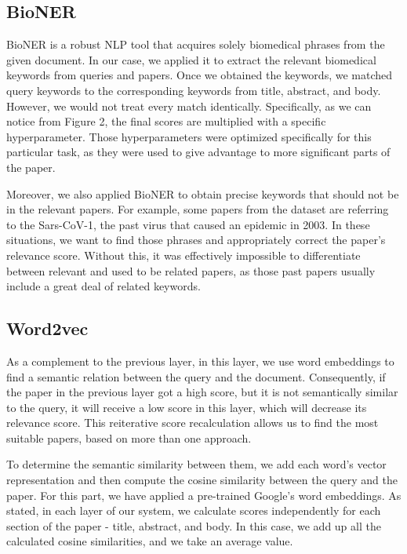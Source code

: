 \documentclass[10pt, a4paper]{article}
\begin{document}
	\subsection{BioNER}
	
	BioNER is a robust NLP tool that acquires solely biomedical phrases from the given document.  In our case, we applied it to extract the relevant biomedical keywords from queries and papers.  Once we obtained the keywords, we matched query keywords to the corresponding keywords from title, abstract, and body. However, we would not treat every match identically. Specifically, as we can notice from Figure 2, the final scores are multiplied with a specific hyperparameter.  Those hyperparameters were optimized specifically for this particular task, as they were used to give advantage to more significant parts of the paper.
	
	Moreover, we also applied BioNER to obtain precise keywords that should not be in the relevant papers. For example, some papers from the dataset are referring to the Sars-CoV-1, the past virus that caused an epidemic in 2003. In these situations, we want to find those phrases and appropriately correct the paper's relevance score. Without this, it was effectively impossible to differentiate between relevant and used to be related papers, as those past papers usually include a great deal of related keywords.
	
	\subsection{Word2vec}
	
	As a complement to the previous layer, in this layer, we use word embeddings to find a semantic relation between the query and the document. Consequently, if the paper in the previous layer got a high score, but it is not semantically similar to the query, it will receive a low score in this layer, which will decrease its relevance score. This reiterative score recalculation allows us to find the most suitable papers, based on more than one approach.
	
	To determine the semantic similarity between them, we add each word's vector representation and then compute the cosine similarity between the query and the paper. For this part, we have applied a pre-trained Google's word embeddings. As stated, in each layer of our system, we calculate scores independently for each section of the paper - title, abstract, and body. In this case, we add up all the calculated cosine similarities, and we take an average value. 
	
\end{document}
